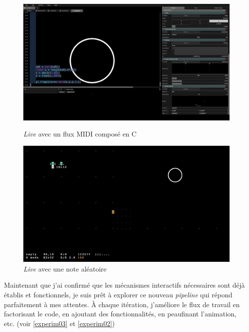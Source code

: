 \begin{figure}[h]
  \begin{minipage}[b]{0.45\linewidth}
    \centering
    \includegraphics[width=\linewidth]{images/experiments/intensifs/experim00.png}
    \caption{\textit{Live} avec un flux MIDI composé en C}
    \label{experim00}
  \end{minipage}
  \hspace{0.1\linewidth} %
  \begin{minipage}[b]{0.45\linewidth}
    \centering
    \includegraphics[width=\linewidth]{images/experiments/intensifs/experim01.png}
    \caption{\textit{Live} avec une note aléatoire}
    \label{experim01}
  \end{minipage}
\end{figure}



Maintenant que j'ai confirmé que les mécanismes interactifs nécessaires sont déjà établis et fonctionnels, je suis prêt à explorer ce nouveau \textit{pipeline} qui répond parfaitement à mes attentes. À chaque itération, j'améliore le flux de travail en factorisant le code, en ajoutant des fonctionnalités, en peaufinant l'animation, etc. (voir \ref{experim03} et \ref{experim02})

